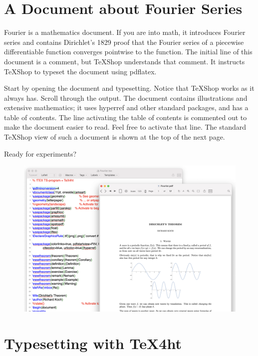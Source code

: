 \documentclass[11pt, oneside]{article}   	%
\begin{document}
\section{A Document about Fourier Series}

Fourier is a mathematics document. If you are into math, it introduces Fourier series and contains Dirichlet's 1829 proof that the Fourier series of a piecewise differentiable function converges pointwise to the function. The initial line of this document is a comment, but TeXShop understands that comment. It instructs TeXShop to typeset the document using pdflatex.

Start by opening the document and typesetting. Notice that TeXShop works as it always has. Scroll through the output. The document contains illustrations and extensive mathematics; it uses hyperref and other standard packages, and  has a table of contents. The line activating the table of contents is commented out to make the document easier to read. Feel free to activate that line. The standard TeXShop view of such a document is shown at the top of the next page.

Ready for experiments?

\newpage


\begin{figure}[htbp] %
     \includegraphics[width=6.8in.]{Graphics/shot1.png} %
   \label{fig:example}
\end{figure}

\section{Typesetting with TeX4ht}
\end{document}
